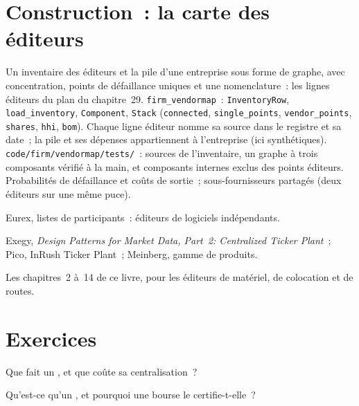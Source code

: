 \section{Construction~: la carte des éditeurs}\label{bld:nw:the-vendor-map:vendormap}

\begin{build}
 Un inventaire des éditeurs et la pile d'une entreprise sous forme de graphe, avec concentration, points de défaillance uniques et une
nomenclature~: les lignes éditeurs du plan du chapitre~29.
 \texttt{firm\_vendormap}~: \texttt{InventoryRow}, \texttt{load\_inventory}, \texttt{Component}, \texttt{Stack}
(\texttt{connected}, \texttt{single\_points}, \texttt{vendor\_points}, \texttt{shares}, \texttt{hhi}, \texttt{bom}).
 Chaque ligne éditeur nomme sa source dans le registre et sa date~; la pile et ses dépenses appartiennent à l'entreprise (ici synthétiques).
 \texttt{code/firm/vendormap/tests/}~: sources de l'inventaire, un graphe à trois composants vérifié à la main, et
composants internes exclus des points éditeurs.
 Probabilités de défaillance et coûts de sortie~; sous-fournisseurs partagés (deux éditeurs sur une même puce).
\end{build}

\begin{omsources}
\item Eurex, listes de participants~: éditeurs de logiciels indépendants.
\item Exegy, \emph{Design Patterns for Market Data, Part~2: Centralized Ticker Plant}~; Pico, InRush Ticker Plant~; Meinberg,
  gamme de produits.
\item Les chapitres~2 à~14 de ce livre, pour les éditeurs de matériel, de colocation et de routes.
\end{omsources}

\section{Exercices}

\begin{exercise}[$\star$]\label{exo:nw:the-vendor-map:1}
Que fait un , et que coûte sa centralisation~?
\end{exercise}

\begin{exercise}[$\star$]\label{exo:nw:the-vendor-map:2}
Qu'est-ce qu'un , et pourquoi une bourse le certifie-t-elle~?
\end{exercise}


